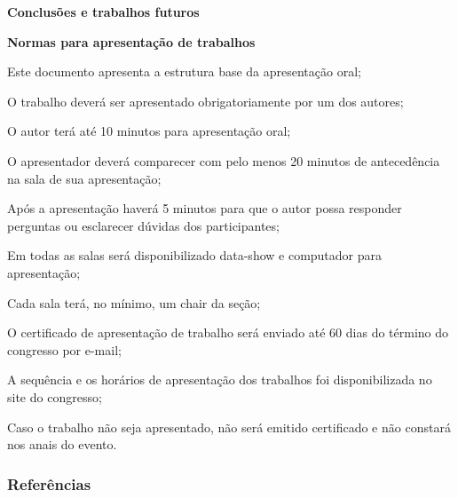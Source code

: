 \documentclass[18pt]{beamer}
\begin{document}
\begin{frame}{\fontsize{20pt}{20}\selectfont \textbf{Conclusões e trabalhos futuros}}



\end{frame}


\begin{frame}[allowframebreaks] {\fontsize{20pt}{20}\selectfont \textbf{Normas para apresentação de trabalhos}}

\begin{itemize}
{\fontsize{11pt}{11}\selectfont
    \item Este documento apresenta a estrutura base da apresentação oral;
    \item O trabalho deverá ser apresentado obrigatoriamente por um dos autores;
    \item O autor terá até 10 minutos para apresentação oral;
    \item O apresentador deverá comparecer com pelo menos 20 minutos de antecedência na sala de sua apresentação;
    \item Após a apresentação haverá 5 minutos para que o autor possa responder perguntas ou esclarecer dúvidas dos participantes;
    
    \framebreak
        
    \item Em todas as salas será disponibilizado data-show e computador para apresentação;
    \item Cada sala terá, no mínimo, um chair da seção;
    \item O certificado de apresentação de trabalho será enviado até 60 dias do término do congresso por e-mail;
    \item A sequência e os horários de apresentação dos trabalhos foi disponibilizada no site do congresso;
    \item Caso o trabalho não seja apresentado, não será emitido certificado e não constará  nos anais do evento.}
\end{itemize}

\end{frame}

\nocite{*}
\begin{frame}[allowframebreaks] 
\frametitle{\fontsize{20pt}{20}\selectfont \textbf{Referências}}
{\scriptsize


}
\end{frame}



\end{document}
